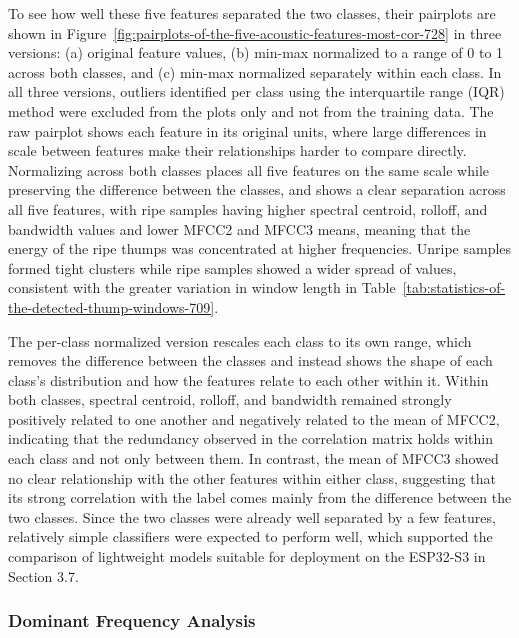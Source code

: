 \begin{thesisprose}
To see how well these five features separated the two classes, their pairplots are shown in Figure~\ref{fig:pairplots-of-the-five-acoustic-features-most-cor-728} in three versions: (a) original feature values, (b) min-max normalized to a range of 0 to 1 across both classes, and (c) min-max normalized separately within each class. In all three versions, outliers identified per class using the interquartile range (IQR) method were excluded from the plots only and not from the training data. The raw pairplot shows each feature in its original units, where large differences in scale between features make their relationships harder to compare directly. Normalizing across both classes places all five features on the same scale while preserving the difference between the classes, and shows a clear separation across all five features, with ripe samples having higher spectral centroid, rolloff, and bandwidth values and lower MFCC2 and MFCC3 means, meaning that the energy of the ripe thumps was concentrated at higher frequencies. Unripe samples formed tight clusters while ripe samples showed a wider spread of values, consistent with the greater variation in window length in Table~\ref{tab:statistics-of-the-detected-thump-windows-709}.

The per-class normalized version rescales each class to its own range, which removes the difference between the classes and instead shows the shape of each class’s distribution and how the features relate to each other within it. Within both classes, spectral centroid, rolloff, and bandwidth remained strongly positively related to one another and negatively related to the mean of MFCC2, indicating that the redundancy observed in the correlation matrix holds within each class and not only between them. In contrast, the mean of MFCC3 showed no clear relationship with the other features within either class, suggesting that its strong correlation with the label comes mainly from the difference between the two classes. Since the two classes were already well separated by a few features, relatively simple classifiers were expected to perform well, which supported the comparison of lightweight models suitable for deployment on the ESP32-S3 in Section 3.7.

\subsubsection*{Dominant Frequency Analysis}


\end{thesisprose}
